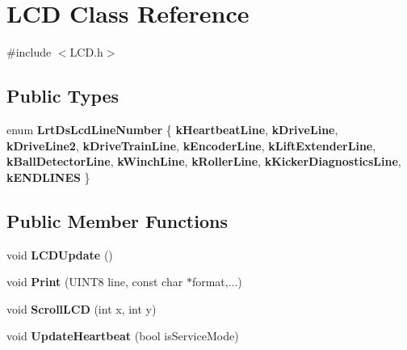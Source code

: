 \hypertarget{class_l_c_d}{
\section{\-L\-C\-D \-Class \-Reference}
\label{class_l_c_d}
}


{\ttfamily \#include $<$\-L\-C\-D.\-h$>$}

\subsection*{\-Public \-Types}
\begin{DoxyCompactItemize}
\item 
enum {\bfseries \-Lrt\-Ds\-Lcd\-Line\-Number} \{ \*
{\bfseries k\-Heartbeat\-Line}, 
{\bfseries k\-Drive\-Line}, 
{\bfseries k\-Drive\-Line2}, 
{\bfseries k\-Drive\-Train\-Line}, 
\*
{\bfseries k\-Encoder\-Line}, 
{\bfseries k\-Lift\-Extender\-Line}, 
{\bfseries k\-Ball\-Detector\-Line}, 
{\bfseries k\-Winch\-Line}, 
\*
{\bfseries k\-Roller\-Line}, 
{\bfseries k\-Kicker\-Diagnostics\-Line}, 
{\bfseries k\-E\-N\-D\-L\-I\-N\-E\-S}
 \}
\end{DoxyCompactItemize}
\subsection*{\-Public \-Member \-Functions}
\begin{DoxyCompactItemize}
\item 
\hypertarget{class_l_c_d_a6d4ff9436b184ea5b53c531204654ac0}{
void {\bfseries \-L\-C\-D\-Update} ()}
\label{class_l_c_d_a6d4ff9436b184ea5b53c531204654ac0}

\item 
\hypertarget{class_l_c_d_a399ae4cd5dbcf309ff8715bb31d8084e}{
void {\bfseries \-Print} (\-U\-I\-N\-T8 line, const char $\ast$format,...)}
\label{class_l_c_d_a399ae4cd5dbcf309ff8715bb31d8084e}

\item 
\hypertarget{class_l_c_d_a4c252131694e58a35d06bd599e725316}{
void {\bfseries \-Scroll\-L\-C\-D} (int x, int y)}
\label{class_l_c_d_a4c252131694e58a35d06bd599e725316}

\item 
\hypertarget{class_l_c_d_a1c423a85f3ed0ac860e472a5d64ded0c}{
void {\bfseries \-Update\-Heartbeat} (bool is\-Service\-Mode)}
\label{class_l_c_d_a1c423a85f3ed0ac860e472a5d64ded0c}

\end{DoxyCompactItemize}
